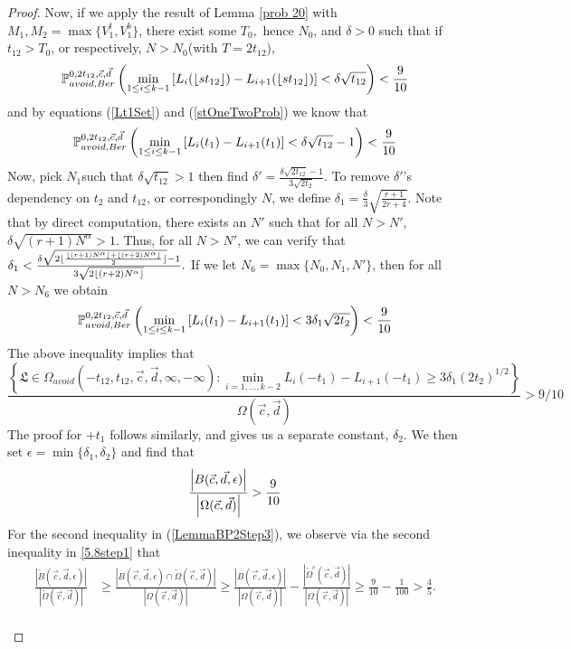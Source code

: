 \begin{proof}
	Now, if we apply the result of Lemma \ref{prob 20} with $M_1,M_2=\max\{V_1^t,V_1^b\}$, there exist some $T_0,$ hence $N_0$, and $\delta>0$ such that if $t_{12}>T_0$, or respectively, $N > N_0$(with $T=2t_{12}$),
	\begin{equation}\label{stOneTwoProb}
	\pr^{0,2t_{12},\vec c, \vec d}_{avoid,Ber}\left(\min_{1\leq i\leq k-1} \left[L_i(\floor{st_{12}})-L_{i+1}(\floor{st_{12}})\right]<\delta\sqrt{t_{12}}\right)<\frac{9}{10}
	\end{equation}
	and by equations (\ref{Lt1Set}) and (\ref{stOneTwoProb}) we know that
	\[
	\pr^{0,2t_{12},\vec c, \vec d}_{avoid,Ber}\left(\min_{1\leq i\leq k-1} \left[L_i(t_1)-L_{i+1}(t_1)\right]<\delta\sqrt{t_{12}}-1\right)<\frac{9}{10}
	\]
	Now, pick $N_1$such that $\delta\sqrt{t_{12}}>1$ then find $\delta'=\frac{\delta\sqrt{2t_{12}}-1}{3\sqrt{2t_2}}$. To remove $\delta'$'s dependency on $t_2$ and $t_{12}$, or correspondingly $N$, we define $\delta_1 = \frac{\delta}{3}\sqrt{\frac{r+1}{2r+4}}.$ Note that by direct computation, there exists an $N'$ such that for all $N > N'$, $\delta\sqrt{(r+1)N^\alpha} > 1.$ Thus, for all $N > N'$, we can verify that $\delta_1 < \frac{\delta\sqrt{2\floor{\frac{\floor{(r+1)N^\alpha}+\floor{(r+2)N^\alpha}}2}}-1}{3\sqrt{2\floor{(r+2)N^\alpha}}}.$ If we let $N_6 = \max\{N_0, N_1, N'\}$, then for all $N>N_6$ we obtain	\[
	\pr^{0,2t_{12},\vec c, \vec d}_{avoid,Ber}\left(\min_{1\leq i\leq k-1} \left[L_i(t_1)-L_{i+1}(t_1)\right]<3\delta_1\sqrt{2t_2}\right)<\frac{9}{10}
	\]
	The above inequality implies that
	$$\frac{\left\{ \mathfrak{L} \in \Omega_{avoid}(-t_{12}, t_{12}, \vec{c}, \vec{d}, \infty, -\infty): \min_{i = 1, \dots, k-2} L_{i}(- t_1) - L_{i+1}(-t_1) \geq 3\delta_1 (2t_2)^{1/2} \right\}}{\Omega(\vec c,\vec d)}>9/10$$ The proof for $+t_1$ follows similarly, and gives us a separate constant, $\delta_2$. We then set $\epsilon=\min\{\delta_1,\delta_2\}$ and find that $$\frac{\abs*{B(\vec c, \vec d, \epsilon)}}{\abs*{\Omega(\vec c, \vec d)}}>\frac{9}{10}$$ 
	For the second inequality in (\ref{LemmaBP2Step3}), we observe via the second inequality in \eqref{5.8step1} that
	\begin{align*}
	\frac{|\tilde{B}(\vec{c},\vec{d},\epsilon)|}{|\tilde{\Omega}(\vec{c},\vec{d})|} &\geq \frac{|B(\vec{c},\vec{d},\epsilon)\cap\tilde{\Omega}(\vec{c},\vec{d})|}{|\Omega(\vec{c},\vec{d})|} \geq \frac{|B(\vec{c},\vec{d},\epsilon)|}{|\Omega(\vec{c},\vec{d})|} -\frac{|\tilde{\Omega}^c(\vec{c},\vec{d})|}{|\Omega(\vec{c},\vec{d})|} \geq \frac{9}{10} - \frac{1}{100} > \frac{4}{5}.
	\end{align*} \\
	

\end{proof}
